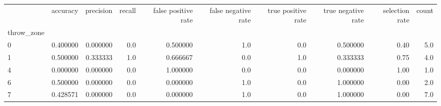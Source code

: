 \begin{tabular}{lrrrrrrrrr}
\toprule
{} &  accuracy &  precision &  recall &  false positive rate &  false negative rate &  true positive rate &  true negative rate &  selection rate &  count \\
throw\_zone &           &            &         &                      &                      &                     &                     &                 &        \\
\midrule
0          &  0.400000 &   0.000000 &     0.0 &             0.500000 &                  1.0 &                 0.0 &            0.500000 &            0.40 &    5.0 \\
1          &  0.500000 &   0.333333 &     1.0 &             0.666667 &                  0.0 &                 1.0 &            0.333333 &            0.75 &    4.0 \\
4          &  0.000000 &   0.000000 &     0.0 &             1.000000 &                  0.0 &                 0.0 &            0.000000 &            1.00 &    1.0 \\
6          &  0.500000 &   0.000000 &     0.0 &             0.000000 &                  1.0 &                 0.0 &            1.000000 &            0.00 &    2.0 \\
7          &  0.428571 &   0.000000 &     0.0 &             0.000000 &                  1.0 &                 0.0 &            1.000000 &            0.00 &    7.0 \\
\bottomrule
\end{tabular}
